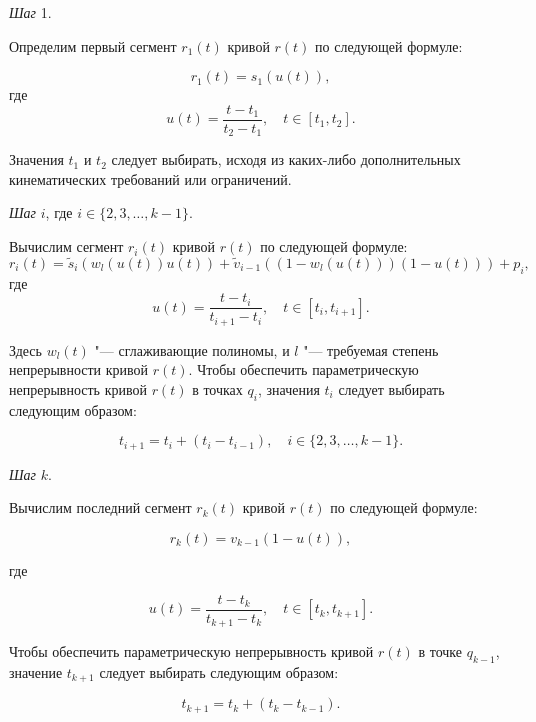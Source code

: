 \bigskip
\textit{Шаг} 1.

Определим первый сегмент $r_1(t)$ кривой $r(t)$ по следующей формуле:

$$
r_1(t)=s_1(u(t)),
$$
\noindent где
$$
u(t)=\frac{t-t_1}{t_2-t_1}, \quad t \in [t_1,t_2].
$$

Значения $t_1$ и $t_2$ следует выбирать, исходя из каких-либо дополнительных кинематических требований или ограничений.

\bigskip
\textit{Шаг} $i$, где $i \in \{2,3,\dots,k-1\}$.

Вычислим сегмент $r_i(t)$ кривой $r(t)$ по следующей формуле:
$$
r_i(t)=\tilde s_i(w_l(u(t))u(t))+\tilde v_{i-1}((1-w_l(u(t)))(1-u(t)))+p_i,
$$
\noindent где
$$
u(t)=\frac{t-t_i}{t_{i+1}-t_i}, \quad t \in [t_i,t_{i+1}].
$$

Здесь $w_l(t)$ "--- сглаживающие полиномы, и $l$ "--- требуемая степень непрерывности кривой $r(t)$. Чтобы обеспечить
параметрическую непрерывность кривой $r(t)$ в точках $q_i$, значения $t_i$ следует выбирать следующим образом:

$$
t_{i+1}=t_i+(t_i-t_{i-1}), \quad i \in \{2,3,\dots,k-1\}.
$$

\bigskip
\textit{Шаг} $k$.

Вычислим последний сегмент $r_k(t)$ кривой $r(t)$ по следующей формуле:

$$
r_k(t)=v_{k-1}(1-u(t)),
$$

\noindent где

$$
u(t)=\frac{t-t_k}{t_{k+1}-t_k}, \quad t \in [t_k,t_{k+1}].
$$

Чтобы обеспечить параметрическую непрерывность кривой $r(t)$ в точке $q_{k-1}$, значение $t_{k+1}$ следует выбирать
следующим образом:

$$
t_{k+1}=t_k+(t_k-t_{k-1}).
$$
